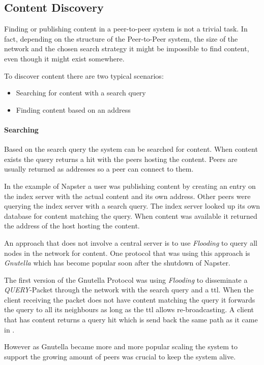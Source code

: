 \subsection{Content Discovery}
Finding or publishing content in a peer-to-peer system is not a trivial task. In fact, depending on the structure of the Peer-to-Peer system, the size of the network and the chosen search strategy it might be impossible to find content, even though it might exist somewhere.

To discover content there are two typical scenarios:
\begin{itemize}
  \item Searching for content with a search query
  \item Finding content based on an address
\end{itemize}

\paragraph{Searching}
Based on the search query the system can be searched for content. When content exists the query returns a hit with the peers hosting the content. Peers are usually returned as addresses so a peer can connect to them.

In the example of Napster a user was publishing content by creating an entry on the index server with the actual content and its own address. Other peers were querying the index server with a search query. The index server looked up its own database for content matching the query. When content was available it returned the address of the host hosting the content. 

An approach that does not involve a central server is to use \textit{Flooding} to query all nodes in the network for content. One protocol that was using this approach is \textit{Gnutella} which has become popular soon after the shutdown of Napster.

The first version of the Gnutella Protocol was using \textit{Flooding} to disseminate a \textit{QUERY}-Packet through the network with the search query and a \gls{ttl}. When the client receiving the packet does not have content matching the query it forwards the query to all its neighbours as long as the \gls{ttl} allows re-broadcasting. A client that has content returns a query hit which is send back the same path as it came in \cite[\S4]{gnutella04}.

However as Gnutella became more and more popular scaling the system to support the growing amount of peers was crucial to keep the system alive.  \cite[\S3.1]{gnutellaAnalysis}

